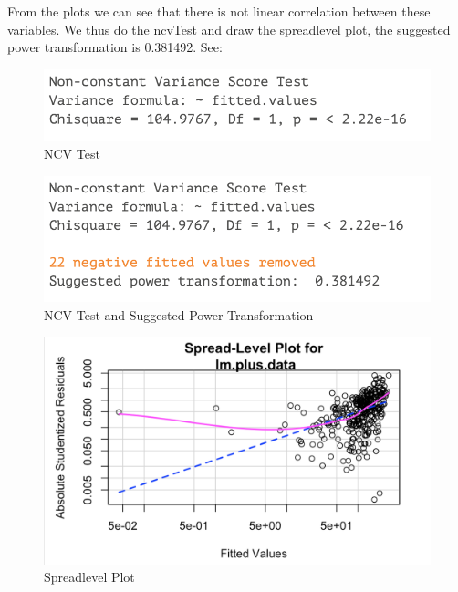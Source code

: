 From the plots we can see that there is not linear correlation between these variables. We thus do the ncvTest and draw the spreadlevel plot, the suggested power transformation is 0.381492. See: 

\begin{figure}[H]
  \centering
  \includegraphics[width = 1.0\textwidth]{Figures/ncv.png}
  \caption[Figures/ncv.png]{NCV Test}
  \label{fig:NCVTest}
\end{figure}

\begin{figure}[H]
  \centering
  \includegraphics[width = 1.0\textwidth]{Figures/ncv_spread.png}
  \caption[Figures/ncv_spread.png]{NCV Test and Suggested Power Transformation}
  \label{fig:NCV Test and Suggested Power Transformation}
\end{figure}

\begin{figure}[H]
  \centering
  \includegraphics[width = 1.0\textwidth]{Figures/spread.png}
  \caption[Figures/spread.png]{Spreadlevel Plot}
  \label{fig:Spreadlevel Plot}
\end{figure}

